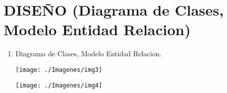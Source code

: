 \section{ DISEÑO (Diagrama de Clases, Modelo Entidad Relacion)} 

\begin{enumerate}[1.]
	\item Diagrama de Clases, Modelo Entidad Relacion.
    


	\begin{center}
	\texttt{[image: ./Imagenes/img3]} 
	\end{center}
	
	\begin{center}
	\texttt{[image: ./Imagenes/img4]} 
	\end{center}

\end{enumerate} 
